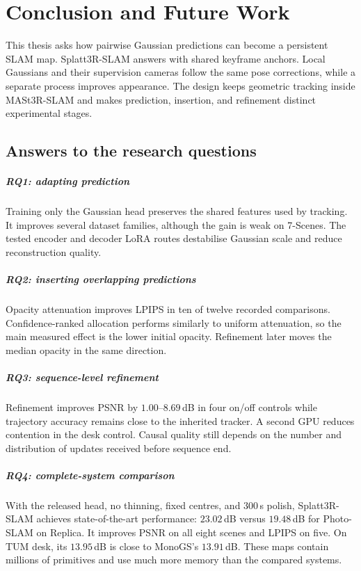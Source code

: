 \chapter{Conclusion and Future Work}
\label{ch:conclusion}

This thesis asks how pairwise Gaussian predictions can become a persistent
SLAM map. Splatt3R-SLAM answers with shared keyframe anchors. Local Gaussians
and their supervision cameras follow the same pose corrections, while a
separate process improves appearance. The design keeps geometric tracking
inside MASt3R-SLAM and makes prediction, insertion, and refinement distinct
experimental stages.

\section{Answers to the research questions}

\paragraph{RQ1: adapting prediction}
Training only the Gaussian head preserves the shared features used by
tracking. It improves several dataset families, although the gain is weak on
7-Scenes. The tested encoder and decoder LoRA routes destabilise Gaussian
scale and reduce reconstruction quality.

\paragraph{RQ2: inserting overlapping predictions}
Opacity attenuation improves LPIPS in ten of twelve recorded comparisons.
Confidence-ranked allocation performs similarly to uniform attenuation, so
the main measured effect is the lower initial opacity. Refinement later moves
the median opacity in the same direction.

\paragraph{RQ3: sequence-level refinement}
Refinement improves PSNR by $1.00$--$8.69$\,dB in four on/off controls while
trajectory accuracy remains close to the inherited tracker. A second GPU
reduces contention in the desk control. Causal quality still depends on the
number and distribution of updates received before sequence end.

\paragraph{RQ4: complete-system comparison}
With the released head, no thinning, fixed centres, and $300$\,s polish,
Splatt3R-SLAM achieves state-of-the-art performance: $23.02$\,dB versus
$19.48$\,dB for Photo-SLAM on Replica. It improves PSNR on all eight scenes
and LPIPS on five. On TUM desk, its $13.95$\,dB is close to MonoGS's
$13.91$\,dB. These maps contain millions of primitives and use much more
memory than the compared systems.

